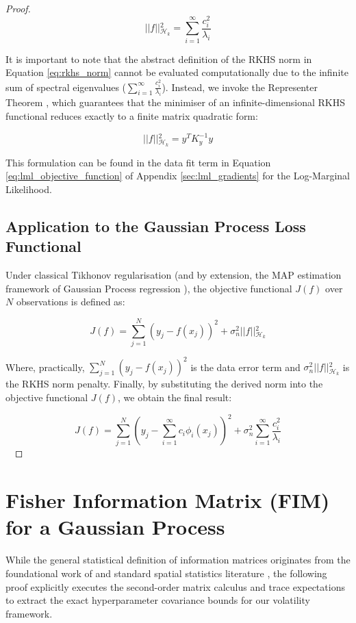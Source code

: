 \documentclass[12pt,oneside]{report}
\theoremstyle{definition}
\theoremstyle{remark}
\begin{document}
\begin{proof}
$$\vert{}\vert{}f\vert{}\vert{}_{\mathcal{H}_k}^2 = \sum_{i=1}^{\infty} \frac{c_i^2}{\lambda_i}$$

It is important to note that the abstract definition of the RKHS norm in Equation \ref{eq:rkhs_norm} cannot be evaluated computationally due to the infinite sum of spectral eigenvalues ($\sum_{i=1}^\infty \frac{c_i^2}{\lambda_i}$). Instead, we invoke the Representer Theorem \cite{kimeldorf1971some, scholkopf2001generalized, rasmussen2006gp}, which guarantees that the minimiser of an infinite-dimensional RKHS functional reduces exactly to a finite matrix quadratic form:

$$\vert{}\vert{}f\vert{}\vert{}_{\mathcal{H}_k}^2 = y^T K_y^{-1} y$$

This formulation can be found in the data fit term in Equation \ref{eq:lml_objective_function} of Appendix \ref{sec:lml_gradients} for the Log-Marginal Likelihood.

\subsection{Application to the Gaussian Process Loss Functional}
Under classical Tikhonov regularisation \cite{tikhonov1963solution} (and by extension, the MAP estimation framework of Gaussian Process regression \cite{rasmussen2006gp}), the objective functional $J(f)$ over $N$ observations is defined as:

$$J(f) = \sum_{j=1}^{N} (y_j - f(x_j))^2 + \sigma_n^2 \vert{}\vert{}f\vert{}\vert{}_{\mathcal{H}_k}^2$$

Where, practically, $\sum_{j=1}^{N} (y_j - f(x_j))^2$ is the data error term and $\sigma_n^2 \vert{}\vert{}f\vert{}\vert{}_{\mathcal{H}_k}^2$ is the RKHS norm penalty. Finally, by substituting the derived norm into the objective functional $J(f)$, we obtain the final result:

$$J(f) = \sum_{j=1}^{N} \left( y_j - \sum_{i=1}^{\infty} c_i \phi_i(x_j) \right)^2 + \sigma_n^2 \sum_{i=1}^{\infty} \frac{c_i^2}{\lambda_i}$$\

\end{proof}

\newpage
\section{Fisher Information Matrix (FIM) for a Gaussian Process}
\label{sec:fim_gp}

While the general statistical definition of information matrices originates from the foundational work of \citet{fisher1922mathematical} and standard spatial statistics literature \citep{rasmussen2006gp}, the following proof explicitly executes the second-order matrix calculus and trace expectations to extract the exact hyperparameter covariance bounds for our volatility framework.
\end{document}
